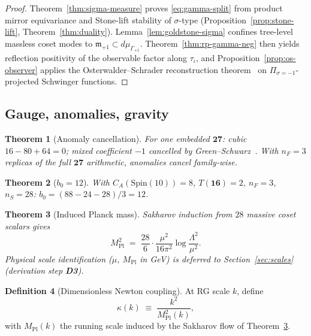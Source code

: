 \documentclass[aps,prd,onecolumn,amsmath,amssymb,nofootinbib,11pt]{revtex4-2}
\numberwithin{equation}{section}
\theoremstyle{plain}
\newtheorem{theorem}{Theorem}[section]
\theoremstyle{definition}
\newtheorem{definition}[theorem]{Definition}
\theoremstyle{remark}
\newcommand{\Spin}{\mathrm{Spin}}
\newcommand{\MPl}{M_{\mathrm{Pl}}}
\begin{document}
\begin{proof}
Theorem~\ref{thm:sigma-measure} proves \eqref{eq:gamma-split} from product
mirror equivariance and Stone-lift stability of $\sigma$-type
(Proposition~\ref{prop:stone-lift}, Theorem~\ref{thm:duality}).
Lemma~\ref{lem:goldstone-sigma} confines tree-level massless coset modes to
$\mathfrak{m}_{+1}\subset d\mu_{\Gamma_{+1}}$. Theorem~\ref{thm:rp-gamma-neg}
then yields reflection positivity of the observable factor along $\tau_\iota$,
and Proposition~\ref{prop:os-observer} applies the Osterwalder--Schrader
reconstruction theorem~\cite{OsterwalderSchrader1973} on
$\Pi_{\sigma=-1}$-projected Schwinger functions.
\end{proof}

\subsection{Gauge, anomalies, gravity}
\label{sec:physics:gauge}

\begin{theorem}[Anomaly cancellation]\label{thm:anomaly}
For one embedded $\mathbf{27}$: cubic $16-80+64=0$; mixed coefficient $-1$
cancelled by Green--Schwarz~\cite{GreenSchwarz1984}. With $n_F=3$ replicas of
the full $\mathbf{27}$ arithmetic, anomalies cancel family-wise.
\end{theorem}

\begin{theorem}[$b_0=12$]\label{thm:beta}
With $C_A(\Spin(10))=8$, $T(\mathbf{16})=2$, $n_F=3$, $n_S=28$:
$b_0=(88-24-28)/3=12$.
\end{theorem}

\begin{theorem}[Induced Planck mass]\label{thm:planck}
Sakharov induction from $28$ massive coset scalars gives
\begin{equation}\label{eq:planck}
  \MPl^2
  \;=\;
  \frac{28}{6}\cdot\frac{\mu^2}{16\pi^2}
  \log\frac{\Lambda^2}{\mu^2}.
\end{equation}
Physical scale identification ($\mu$, $\MPl$ in GeV) is deferred to
Section~\ref{sec:scales} (derivation step \textbf{D3}).
\end{theorem}

\begin{definition}[Dimensionless Newton coupling]\label{def:kappa}
At RG scale $k$, define
\begin{equation}\label{eq:kappa-def}
  \kappa(k)\;\equiv\;\frac{k^2}{\MPl^2(k)},
\end{equation}
with $\MPl(k)$ the running scale induced by the Sakharov flow of
Theorem~\ref{thm:planck}.
\end{definition}
\end{document}
